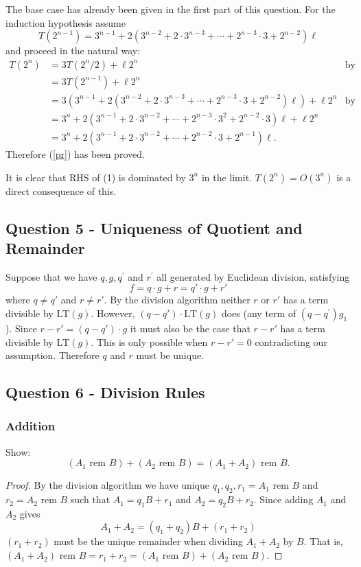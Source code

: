 \documentclass[12pt]{report}
\newcommand{\rem}{\text{ rem }}
\begin{document}
The base case has already been given in the first part of this question. For the induction hypothesis assume
$$T(2^{n-1}) = 3^{n-1} + 2(3^{n-2}+2 \cdot 3^{n-3} + \cdots + 2^{n-3} \cdot 3 + 2^{n-2}) \ell$$
and proceed in the natural way:
\begin{align*}
T(2^n) &= 3T(2^n/2) + \ell 2^n & \text{by definition}& \\ 
&= 3T(2^{n-1}) + \ell 2^n & & \\
&= 3(3^{n-1} + 2(3^{n-2}+2 \cdot 3^{n-3} + \cdots + 2^{n-3} \cdot 3 + 2^{n-2}) \ell)+\ell2^n & \text{by assumption} & \\
&=3^n+2(3^{n-1}+2\cdot3^{n-2}+\cdots+2^{n-3}\cdot3^2+2^{n-2}\cdot3)\ell+\ell2^n & &\\
&=3^n + 2(3^{n-1}+2\cdot3^{n-2}+ \cdots + 2^{n-2}\cdot 3 + 2^{n-1})\ell. & &
\end{align*}
Therefore (\ref{pr}) has been proved.

It is clear that RHS of (1) is dominated by $3^n$ in the limit. $T(2^n) = O(3^n)$ is a direct consequence of this.

\subsection*{Question 5 - Uniqueness of Quotient and Remainder}
Suppose that we have $q,g,q^\prime$ and $r^\prime$ all generated by Euclidean division, satisfying $$ f = q \cdot g + r = q' \cdot g + r' $$ where $q \neq q'$ and $r \neq r'$. By the division algorithm neither $r$ or $r'$ has a term divisible by $\text{LT}{(g)}$. However, $(q-q') \cdot \text{LT}(g)$ does (any term of $(q-q^\prime)g_1$). Since $r - r'=(q - q') \cdot g$ it must also be the case that $r-r'$ has a term divisible by $\text{LT}(g)$. This is only possible when $r - r' = 0$ contradicting our assumption. Therefore $q$ and $r$ must be unique.

\subsection*{Question 6 - Division Rules}
\subsubsection{Addition}
Show: $$(A_1 \rem B) + (A_2 \rem B) = (A_1 + A_2 )\rem B.$$

\begin{proof}
By the division algorithm we have unique $q_1,q_2,r_1=A_1 \rem B$ and $r_2 = A_2 \rem B$ such that $A_1 = q_1 B + r_1$ and $A_2 = q_2 B + r_2$. Since adding $A_1$ and $A_2$ gives $$A_1 + A_2 = (q_1 + q_2)B + (r_1+r_2)$$
$(r_1 + r_2)$ must be the unique remainder when dividing $A_1 + A_2$ by $B$. That is, $(A_1+A_2) \rem B = r_1 + r_2 = (A_1 \rem B) + (A_2 \rem B)$. 
\end{proof}
\end{document}
